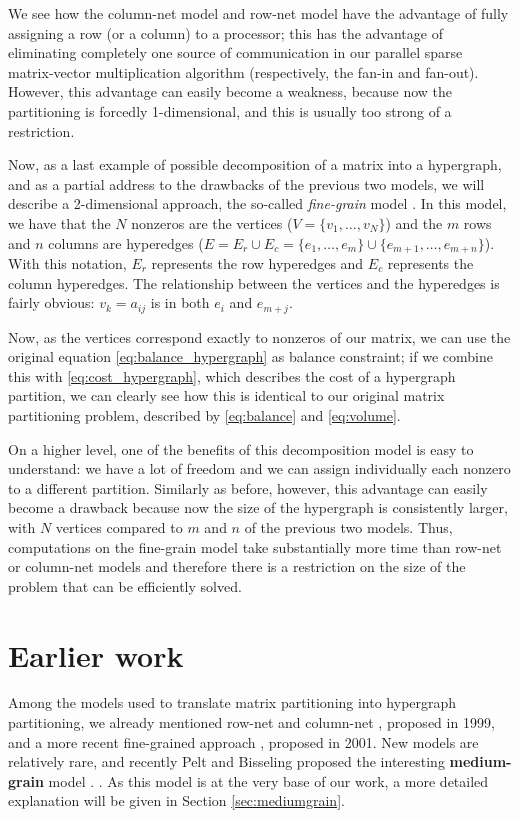 We see how the column-net model and row-net model have the advantage of fully assigning a row (or a column) to a processor; this has the advantage of eliminating completely one source of communication in our parallel sparse matrix-vector multiplication algorithm (respectively, the fan-in and fan-out). However, this advantage can easily become a weakness, because now the partitioning is forcedly 1-dimensional, and this is usually too strong of a restriction.

Now, as a last example of possible decomposition of a matrix into a hypergraph, and as a partial address to the drawbacks of the previous two models, we will describe a 2-dimensional approach, the so-called \emph{fine-grain} model \cite{hypergraph_finegrain}. In this model, we have that the $N$ nonzeros are the vertices ($V = \{ v_1,\dots,v_N\}$) and the $m$ rows and $n$ columns are hyperedges ($E = E_r \cup E_c = \{ e_1,\dots,e_m \} \cup \{e_{m+1},\dots,e_{m+n}\}$). With this notation, $E_r$ represents the row hyperedges and $E_c$ represents the column hyperedges. The relationship between the vertices and the hyperedges is fairly obvious: $v_k = a_{ij}$ is in both $e_i$ and $e_{m+j}$.

Now, as the vertices correspond exactly to nonzeros of our matrix, we can use the original equation \eqref{eq:balance_hypergraph} as balance constraint; if we combine this with \eqref{eq:cost_hypergraph}, which describes the cost of a hypergraph partition, we can clearly see how this is identical to our original matrix partitioning problem, described by \eqref{eq:balance} and \eqref{eq:volume}.

On a higher level, one of the benefits of this decomposition model is easy to understand: we have a lot of freedom and we can assign individually each nonzero to a different partition. Similarly as before, however, this advantage can easily become a drawback because now the size of the hypergraph is consistently larger, with $N$ vertices compared to $m$ and $n$ of the previous two models. Thus, computations on the fine-grain model take substantially more time than row-net or column-net models and therefore there is a restriction on the size of the problem that can be efficiently solved.

\section{Earlier work}

Among the models used to translate matrix partitioning into hypergraph partitioning, we already mentioned row-net and column-net \cite{hypergraph_model}, proposed in 1999, and a more recent fine-grained approach \cite{hypergraph_finegrain}, proposed in 2001. New models are relatively rare, and recently Pelt and Bisseling proposed the interesting \textbf{medium-grain} model .  \cite{mediumgrain}.  As this model is at the very base of our work, a more detailed explanation will be given in Section \ref{sec:mediumgrain}.

